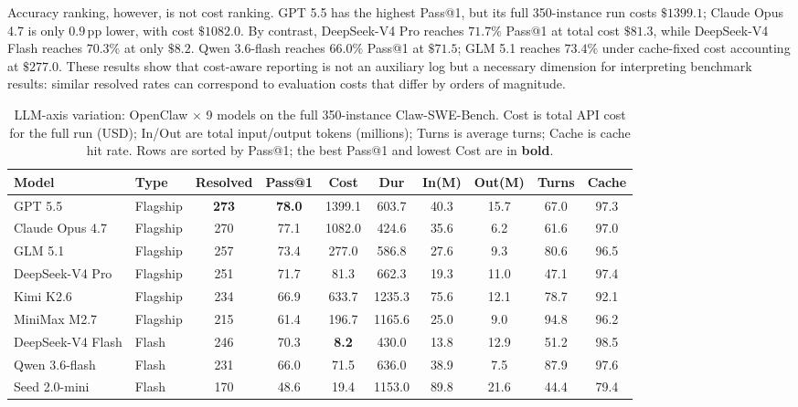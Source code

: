 \documentclass{llmxive}
\providecommand{\arraystretch}{1.0}
\begin{document}
Accuracy ranking, however, is not cost ranking. GPT 5.5 has the highest Pass@1, but its full 350-instance run costs $\$1399.1$; Claude Opus 4.7 is only $0.9$\,pp lower, with cost $\$1082.0$. By contrast, DeepSeek-V4 Pro reaches $71.7\%$ Pass@1 at total cost $\$81.3$, while DeepSeek-V4 Flash reaches $70.3\%$ at only $\$8.2$. Qwen 3.6-flash reaches $66.0\%$ Pass@1 at $\$71.5$; GLM 5.1 reaches $73.4\%$ under cache-fixed cost accounting at $\$277.0$. These results show that cost-aware reporting is not an auxiliary log but a necessary dimension for interpreting benchmark results: similar resolved rates can correspond to evaluation costs that differ by orders of magnitude.

\begin{table}[t]
  \centering
  \scriptsize
  \renewcommand{\arraystretch}{1}
  \setlength{\tabcolsep}{3.3pt}
  \begin{tabular*}{0.95\linewidth}{@{\extracolsep{\fill}}ll|cccccccc@{}}
    \toprule
    \textbf{Model} & \textbf{Type} & \textbf{Resolved} & \textbf{Pass@1} & \textbf{Cost} & \textbf{Dur} & \textbf{In(M)} & \textbf{Out(M)} & \textbf{Turns} & \textbf{Cache} \\
    \midrule
    GPT 5.5             & Flagship & \textbf{273} & \textbf{78.0} & 1399.1 & 603.7 & 40.3 & 15.7 & 67.0 & 97.3 \\
    Claude Opus 4.7     & Flagship & 270 & 77.1 & 1082.0 & 424.6 & 35.6 & 6.2  & 61.6 & 97.0 \\
    GLM 5.1             & Flagship & 257 & 73.4 & 277.0  & 586.8 & 27.6 & 9.3  & 80.6 & 96.5 \\
    DeepSeek-V4 Pro     & Flagship & 251 & 71.7 & 81.3   & 662.3 & 19.3 & 11.0 & 47.1 & 97.4 \\
    Kimi K2.6            & Flagship & 234 & 66.9 & 633.7  & 1235.3& 75.6 & 12.1 & 78.7 & 92.1 \\
    MiniMax M2.7        & Flagship & 215 & 61.4 & 196.7  & 1165.6& 25.0 & 9.0  & 94.8 & 96.2 \\
    \midrule
    DeepSeek-V4 Flash   & Flash    & 246 & 70.3 & \textbf{8.2}   & 430.0 & 13.8 & 12.9 & 51.2 & 98.5 \\
    Qwen 3.6-flash      & Flash    & 231 & 66.0 & 71.5   & 636.0 & 38.9 & 7.5  & 87.9 & 97.6 \\
    Seed 2.0-mini       & Flash    & 170 & 48.6 & 19.4   & 1153.0& 89.8 & 21.6 & 44.4 & 79.4 \\
    \bottomrule
  \end{tabular*}
\caption{LLM-axis variation: OpenClaw $\times$ 9 models on the full 350-instance Claw-SWE-Bench. Cost is total API cost for the full run (USD); In/Out are total input/output tokens (millions); Turns is average turns; Cache is cache hit rate. Rows are sorted by Pass@1; the best Pass@1 and lowest Cost are in \textbf{bold}.}
\label{tab:a2}
\end{table}
\end{document}
